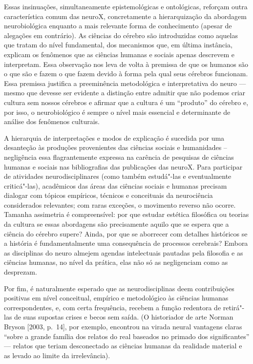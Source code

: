 Essas insinuações, simultaneamente epistemológicas e ontológicas,
reforçam outra característica comum das neuroX, concretamente a
hierarquização da abordagem neurobiológica enquanto a mais relevante
forma de conhecimento (apesar de alegações em contrário). As
ciências do cérebro são introduzidas como aquelas que tratam do nível
fundamental, dos mecanismos que, em última instância, explicam os
fenômenos que as ciências humanas e sociais apenas descrevem e
interpretam. Essa observação nos leva de volta à premissa de que os
humanos são o que são e fazem o que fazem devido à forma pela qual seus
cérebros funcionam. Essa premissa justifica a preeminência metodológica
e interpretativa do neuro --- mesmo que devesse ser evidente a distinção
entre admitir que não podemos criar cultura sem nossos cérebros e
afirmar que a cultura é um ``produto'' do cérebro e, por isso, o
neurobiológico é sempre o nível mais essencial e determinante de análise
dos fenômenos culturais.

A hierarquia de interpretações e modos de explicação é sucedida por uma
desanteção às produções provenientes das ciências sociais e humanidades --
negligência essa flagrantemente expressa na carência de pesquisas de
ciências humanas e sociais nas bibliografias das publicações das neuroX.
Para participar de atividades neurodisciplinares (como também estudá"-las
e eventualmente criticá"-las), acadêmicos das áreas das ciências sociais
e humanas precisam dialogar com tópicos empíricos, técnicos e conceituais
da neurociência considerados relevantes; com raras exceções, o movimento
reverso não ocorre. Tamanha assimetria é compreensível: por que estudar
estética filosófica ou teorias da cultura se essas abordagens são
precisamente aquilo que se espera que a ciência do cérebro supere?
Ainda, por que se aborrecer com detalhes históricos se a história é
fundamentalmente uma consequência de processos cerebrais? Embora as
disciplinas do neuro almejem agendas intelectuais pautadas pela
filosofia e as ciências humanas, no nível da prática, elas não só as
negligenciam como as desprezam.

Por fim, é naturalmente esperado que as neurodisciplinas deem
contribuições positivas em nível conceitual, empírico e metodológico às
ciências humanas correspondentes, e, com certa frequência, recebem a
função redentora de retirá"-las de suas supostas crises e becos sem
saída. (O historiador de arte Norman Bryson {[}2003, p.~14{]}, por
exemplo, encontrou na virada neural vantagens claras ``sobre a grande
família dos relatos do real baseados no primado dos significantes'' ---
relatos que teriam desconectado as ciências humanas da realidade
material e as levado ao limite da irrelevância).

